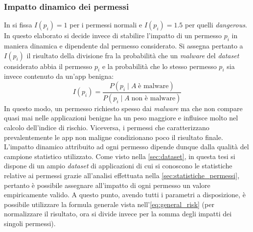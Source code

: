 \documentclass[12pt,a4paper,oneside]{article}
\begin{document}
\subsubsection*{Impatto dinamico dei permessi}

In \cite{WANG_QUANTITATIVE} si fissa $I\left(p_i\right) = 1$ per i permessi normali e $I\left(p_i\right) = 1.5$ per quelli \textit{dangerous}. In questo elaborato si decide invece di stabilire l'impatto di un permesso $p_i$ in maniera dinamica e dipendente dal permesso considerato. Si assegna pertanto a $I\left(p_i\right)$ il risultato della divisione fra la probabilità che un \textit{malware} del \textit{dataset} considerato abbia il permesso $p_i$ e la  probabilità che lo stesso permesso $p_i$ sia invece contenuto da un'app benigna:
\begin{equation}\label{eq:impact}
I\left(p_i\right) = \frac{P\left(p_i \mid A\;\text{è malware}\right)}{P\left(p_i \mid A\;\text{non è malware}\right)}
\end{equation}
In questo modo, un permesso richiesto spesso dai \textit{malware} ma che non compare quasi mai nelle applicazioni benigne ha un peso maggiore e influisce molto nel calcolo dell'indice di rischio. Viceversa, i permessi che caratterizzano prevalentemente le app non maligne condizionano poco il risultato finale. L'impatto dinamico attribuito ad ogni permesso dipende dunque dalla qualità del campione statistico utilizzato. Come visto nella \cref{sec:dataset}, in questa tesi si dispone di un ampio \textit{dataset} di applicazioni di cui si conoscono le statistiche relative ai permessi grazie all'analisi effettuata nella \cref{sec:statistiche_permessi}, pertanto è possibile assegnare all'impatto di ogni permesso un valore empiricamente valido. A questo punto, avendo tutti i parametri a disposizione, è possibile utilizzare la formula generale vista nell'\cref{eq:general_risk} (per normalizzare il risultato, ora si divide invece per la somma degli impatti dei singoli permessi). 
\newline
\end{document}
